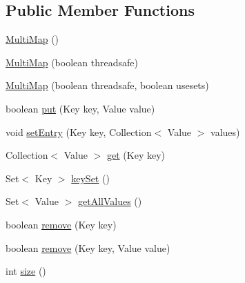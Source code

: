 \subsection*{Public Member Functions}
\begin{DoxyCompactItemize}
\item 
\hyperlink{classorg_1_1semanticweb_1_1owlapi_1_1util_1_1_multi_map_3_01_key_00_01_value_01_4_a5a881ad106278842d8bd6cfbf7146cdf}{Multi\-Map} ()
\item 
\hyperlink{classorg_1_1semanticweb_1_1owlapi_1_1util_1_1_multi_map_3_01_key_00_01_value_01_4_a88788fa758624aeb75f02162aed61976}{Multi\-Map} (boolean threadsafe)
\item 
\hyperlink{classorg_1_1semanticweb_1_1owlapi_1_1util_1_1_multi_map_3_01_key_00_01_value_01_4_a82c16dd6595ceca5328b4169efcd90dc}{Multi\-Map} (boolean threadsafe, boolean usesets)
\item 
boolean \hyperlink{classorg_1_1semanticweb_1_1owlapi_1_1util_1_1_multi_map_3_01_key_00_01_value_01_4_ae8a02dc2ae4d3fdfb7f0b7fe226cfaf5}{put} (Key key, Value value)
\item 
void \hyperlink{classorg_1_1semanticweb_1_1owlapi_1_1util_1_1_multi_map_3_01_key_00_01_value_01_4_ab246107845dfdffa6c3371b2011c57f6}{set\-Entry} (Key key, Collection$<$ Value $>$ values)
\item 
Collection$<$ Value $>$ \hyperlink{classorg_1_1semanticweb_1_1owlapi_1_1util_1_1_multi_map_3_01_key_00_01_value_01_4_a9c0d66e9e77fc63cd2c6efc76e64e06e}{get} (Key key)
\item 
Set$<$ Key $>$ \hyperlink{classorg_1_1semanticweb_1_1owlapi_1_1util_1_1_multi_map_3_01_key_00_01_value_01_4_a1d143fe9a6398c7666d0456c0e4b93fa}{key\-Set} ()
\item 
Set$<$ Value $>$ \hyperlink{classorg_1_1semanticweb_1_1owlapi_1_1util_1_1_multi_map_3_01_key_00_01_value_01_4_a24c8b0c40bc15c91453cea0a480239fe}{get\-All\-Values} ()
\item 
boolean \hyperlink{classorg_1_1semanticweb_1_1owlapi_1_1util_1_1_multi_map_3_01_key_00_01_value_01_4_aec73ff422b4c0dad3236c46c82ca76e0}{remove} (Key key)
\item 
boolean \hyperlink{classorg_1_1semanticweb_1_1owlapi_1_1util_1_1_multi_map_3_01_key_00_01_value_01_4_a42e84b3f4aa17771e24bef60c2867838}{remove} (Key key, Value value)
\item 
int \hyperlink{classorg_1_1semanticweb_1_1owlapi_1_1util_1_1_multi_map_3_01_key_00_01_value_01_4_af6073d40f714884c1a7bcc221795b28d}{size} ()
\item 

\end{DoxyCompactItemize}
